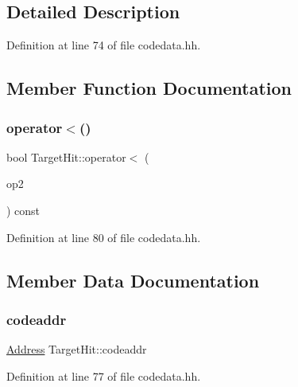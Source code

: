 \subsection{Detailed Description}


Definition at line 74 of file codedata.\+hh.



\subsection{Member Function Documentation}
\mbox{\label{class_target_hit_a1391c4f1e43c98bf9429cfe1d7fcddb2}} 
\subsubsection{\texorpdfstring{operator$<$()}{operator<()}}
{\footnotesize\ttfamily bool Target\+Hit\+::operator$<$ (\begin{DoxyParamCaption}\item[{const \mbox{\hyperlink{class_target_hit}{Target\+Hit}} \&}]{op2 }\end{DoxyParamCaption}) const\hspace{0.3cm}{\ttfamily [inline]}}



Definition at line 80 of file codedata.\+hh.



\subsection{Member Data Documentation}
\mbox{\label{class_target_hit_aa75c5e43b6f1706946f41bc6f22b9fa8}} 
\subsubsection{\texorpdfstring{codeaddr}{codeaddr}}
{\footnotesize\ttfamily \mbox{\hyperlink{class_address}{Address}} Target\+Hit\+::codeaddr}



Definition at line 77 of file codedata.\+hh.

\mbox{\label{class_target_hit_a42ab0e3c3352543d9cb200d17b7e74b7}} 
